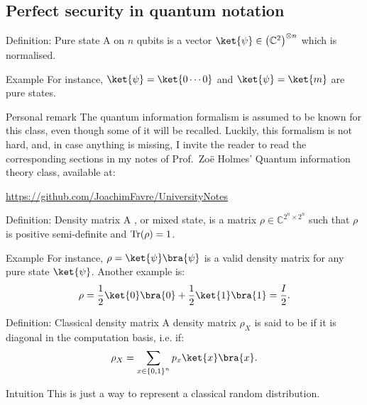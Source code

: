 \documentclass[a4paper]{article}
\begin{document}
\subsection{Perfect security in quantum notation}

\begin{parag}{Definition: Pure state}
    A  on $n$ qubits is a vector $\ket{\psi} \in \left(\mathbb{C}^2\right)^{\otimes n}$ which is normalised.

    \begin{subparag}{Example}
        For instance, $\ket{\psi} = \ket{0 \cdots 0}$ and $\ket{\psi} = \ket{m}$ are pure states.
    \end{subparag}

    \begin{subparag}{Personal remark}
        The quantum information formalism is assumed to be known for this class, even though some of it will be recalled. Luckily, this formalism is not hard, and, in case anything is missing, I invite the reader to read the corresponding sections in my notes of Prof.~Zoë Holmes' Quantum information theory class, available at:
        \begin{center}
            \url{https://github.com/JoachimFavre/UniversityNotes}
        \end{center}
    \end{subparag}
\end{parag}
 
\begin{parag}{Definition: Density matrix}
    A , or mixed state, is a matrix $\rho \in \mathbb{C}^{2^n \times 2^n}$ such that $\rho$ is positive semi-definite and $\Tr\left(\rho\right) = 1$.

    \begin{subparag}{Example}
        For instance, $\rho = \ket{\psi}\bra{\psi}$ is a valid density matrix for any pure state $\ket{\psi}$. Another example is: 
        \[\rho = \frac{1}{2} \ket{0}\bra{0} + \frac{1}{2} \ket{1}\bra{1} = \frac{I}{2}.\]
    \end{subparag}
\end{parag}

\begin{parag}{Definition: Classical density matrix}
    A density matrix $\rho_X$ is said to be  if it is diagonal in the computation basis, i.e. if: 
    \[\rho_X = \sum_{x \in \left\{0, 1\right\}^n} p_x \ket{x}\bra{x}.\]

    \begin{subparag}{Intuition}
        This is just a way to represent a classical random distribution.
    \end{subparag}
\end{parag}
\end{document}
